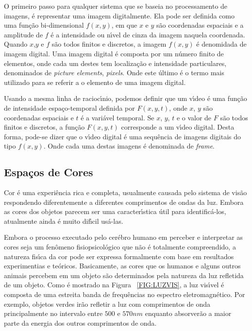O primeiro passo para qualquer sistema que se baseia no processamento de imagens, \'{e} representar uma imagem digitalmente. Ela pode ser definida como uma fun\c{c}\~{a}o bi-dimensional $f(x,y)$, em que $x$ e $y$  s\~{a}o coordenadas espaciais e a amplitude de $f$ \'{e} a intensidade ou n\'{\i}vel de cinza da imagem naquela coordenada. Quando $x$,$y$ e $f$ s\~{a}o todos finitos e discretos, a imagem $f(x,y)$ \'{e} denomidada de imagem digital. Uma imagem digital \'{e} composta por um n\'{u}mero finito de elementos, onde cada um destes tem localiza\c{c}\~{a}o e intensidade particulares, denominados de \emph{picture elements}, \emph{pixels}. Onde este \'{u}ltimo \'{e} o termo mais utilizado para se referir a o elemento de uma imagem digital\cite{GONZALEZ:2008}.

Usando a mesma linha de racioc\'{\i}nio, podemos definir que um v\'{\i}deo \'{e} uma fun\c{c}\~{a}o de intensidade espa\c{c}o-temporal definida por $F(x,y,t)$, onde $x$, $y$ s\~{a}o coordenadas espaciais e $t$ \'{e} a vari\'{a}vel temporal. Se $x$, $y$, $t$ e o valor de $F$ s\~{a}o todos finitos e discretos, a fun\c{c}\~{a}o $F(x,y,t)$ corresponde a um v\'{\i}deo digital. Desta forma, pode-se dizer que o v\'{\i}deo digital \'{e} uma sequ\^{e}ncia de imagens digitais do tipo $f(x,y)$. Onde cada uma destas imagens \'{e} denominada de \emph{frame}\cite{TEKALP:1995}.

\subsection{Espa\c{c}os de Cores}

Cor \'{e} uma experi\^{e}ncia rica e completa, usualmente causada pelo sistema de vis\~{a}o respondendo diferentemente a diferentes comprimentos de ondas da luz. Embora as cores dos objetos parecem ser uma caracter\'{\i}stica \'{u}til para identific\'{a}-los, atualmente ainda \'{e} muito dif\'{\i}cil us\'{a}-las\cite{FORSYTH:2003}.

Embora o processo executado pelo cer\'{e}bro humano em perceber e interpretar as cores seja um fen\^{o}meno fisiopsicol\'{o}gico que n\~{a}o \'{e} totalmente compreendido, a natureza fis\'{\i}ca da cor pode ser expressa formalmente com base em resultados experimentias e te\'{o}ricos. Basicamente, as cores que os humanos e alguns outros animais percebem em um objeto s\~{a}o determinados pela natureza da luz refletida de um objeto. Como \'{e} mostrado na Figura ~\ref{FIG:LUZVIS}, a luz vis\'{\i}vel \'{e} composta de uma estreita banda de frequ\^{e}ncias no espectro eletromagn\'{e}tico. Por exemplo, objetos verdes ir\~{a}o refletir a luz com comprimentos de onda principalmente no intervalo entre $500$ e $570 nm$ enquanto absorver\~{a}o a maior parte da energia dos outros comprimentos de onda\cite{GONZALEZ:2008}.

